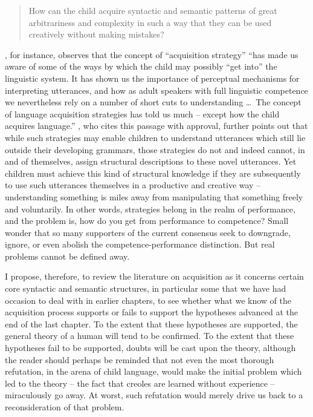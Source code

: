 \begin{quote}
How can the child acquire syntactic and semantic patterns of great arbitrariness and complexity in such a way that they can be used creatively without making mistakes?
\end{quote}

\citet[353]{Cromer1976}, for instance, observes that the concept of %
``acquisition strategy'' ``has made us aware of some of the ways by which the child may possibly ``get into'' the linguistic system. It has shown us the importance of perceptual mechanisms for interpreting utterances, and how as adult speakers with full linguistic competence we nevertheless rely on a number of short cuts to understanding \ldots~The concept of language acquisition strategies has told us much -- except how the child acquires language.'' \citet{Bowerman1979}, who cites this passage with approval, further points out that while such strategies may enable children to understand utterances which still lie outside their developing grammars, those strategies do not and indeed cannot, in and of themselves, assign structural descriptions to these novel utterances. Yet children must achieve this kind of structural knowledge if they are subsequently to use such utterances themselves in a productive and creative way -- understanding something is miles away from manipulating that something freely and voluntarily. In other words, strategies belong in the realm of performance, and the problem is, how do you get from performance to competence? Small wonder that so many supporters of the current consensus seek to downgrade, ignore, or even abolish the competence-performance distinction. But real problems cannot be defined away.

I propose, therefore, to review the literature on acquisition as it concerns certain core syntactic and semantic structures, in particular some that we have had occasion to deal with in earlier chapters, to see whether what we know of the acquisition process supports or fails to support the hypotheses advanced at the end of the last chapter. To the extent that these hypotheses are supported, the general theory of a human  will tend to be confirmed. To the extent that these hypotheses fail to be supported, doubts will be cast upon the theory, although the reader should perhaps be reminded that not even the most thorough refutation, in the arena of child language, would make the initial problem which led to the theory -- the fact that creoles are learned without experience -- miraculously go away. At worst, such refutation would merely drive us back to a reconsideration of that problem.

